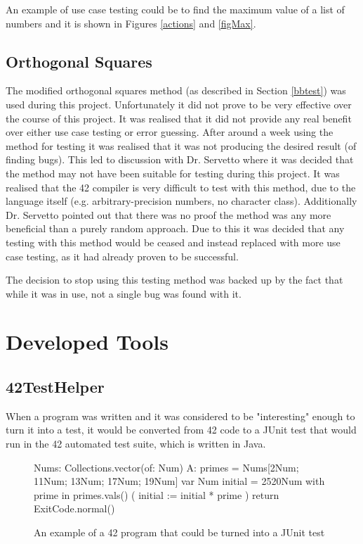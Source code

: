An example of use case testing could be to find the maximum value of a list of numbers and it is shown in Figures \ref{actions} and \ref{figMax}.



\subsection{Orthogonal Squares}

The modified orthogonal squares method (as described in Section \ref{bbtest}) was used during this project. Unfortunately it did not prove to be very effective over the course of this project. It was realised that it did not provide any real benefit over either use case testing or error guessing. After around a week using the method for testing it was realised that it was not producing the desired result (of finding bugs). This led to discussion with Dr. Servetto where it was decided that the method may not have been suitable for testing during this project. It was realised that the 42 compiler is very difficult to test with this method, due to the language itself (e.g. arbitrary-precision numbers, no character class). Additionally Dr. Servetto pointed out that there was no proof the method was any more beneficial than a purely random approach. Due to this it was decided that any testing with this method would be ceased and instead replaced with more use case testing, as it had already proven to be successful. 

The decision to stop using this testing method was backed up by the fact that while it was in use, not a single bug was found with it.



\section{Developed Tools}

\subsection{42TestHelper \label{42TestHelper}}


When a program was written and it was considered to be "interesting" enough to turn it into a test, it would be converted from 42 code to a JUnit \cite{junit} test that would run in the 42 automated test suite, which is written in Java.

\begin{figure}[h]

	\begin{42listing}
	Nums: Collections.vector(of: Num)
	A: {
		primes = Nums[2Num; 11Num; 13Num; 17Num; 19Num]
		var Num initial = 2520Num
		with prime in primes.vals() (
			initial := initial * prime
		)
		return ExitCode.normal()
	}
	\end{42listing}
	\caption{An example of a 42 program \label{42code} that could be turned into a JUnit test}
\end{figure}

